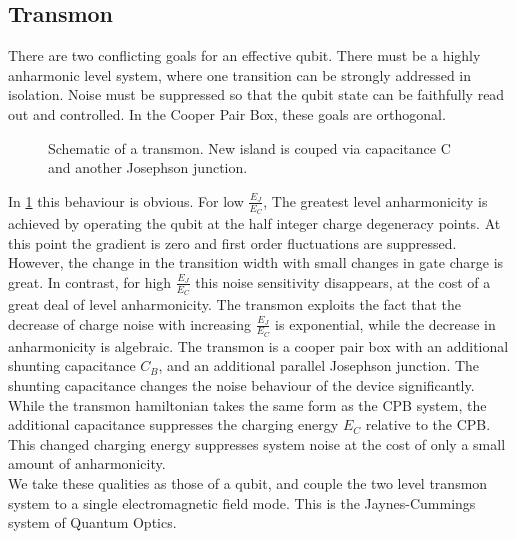 \subsection{Transmon}
There are two conflicting goals for an effective qubit. 
There must be a highly anharmonic level system, where one transition can be strongly addressed in isolation. 
Noise must be suppressed so that the qubit state can be faithfully read out and controlled. 
In the Cooper Pair Box, these goals are orthogonal.
\begin{figure}[!htb]
  \resizebox{1.0\linewidth}{!}{}
  \caption{Schematic of a transmon. New island is couped via capacitance C and another Josephson junction.}
  \label{anharmonicity}
\end{figure}
In \ref{anharmonicity} this behaviour is obvious. 
For low $\frac{E_J}{E_C}$, The greatest level anharmonicity is achieved by operating the qubit at the half integer charge degeneracy points.
At this point the gradient is zero and first order fluctuations are suppressed. 
However, the change in the transition width with small changes in gate charge is great. 
In contrast, for high $\frac{E_J}{E_C}$ this noise sensitivity disappears, at the cost of a great deal of level anharmonicity.
The transmon exploits the fact that the decrease of charge noise with increasing $\frac{E_J}{E_C}$ is exponential, while the decrease in anharmonicity is algebraic.
The transmon is a cooper pair box with an additional shunting capacitance $C_B$, and an additional parallel Josephson junction.
The shunting capacitance changes the noise behaviour of the device significantly.
While the transmon hamiltonian takes the same form as the CPB system, the additional capacitance suppresses the charging energy $E_C$ relative to the CPB.
This changed charging energy suppresses system noise at the cost of only a small amount of anharmonicity. \\

We take these qualities as those of a qubit, and couple the two level transmon system to a single electromagnetic field mode.
This is the Jaynes-Cummings system of Quantum Optics.
